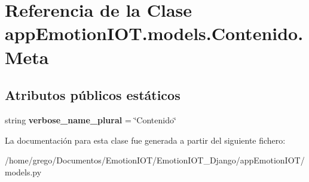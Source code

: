 \hypertarget{classappEmotionIOT_1_1models_1_1Contenido_1_1Meta}{}\section{Referencia de la Clase app\+Emotion\+I\+O\+T.\+models.\+Contenido.\+Meta}
\label{classappEmotionIOT_1_1models_1_1Contenido_1_1Meta}
\subsection*{Atributos públicos estáticos}
\begin{DoxyCompactItemize}
\item 
string {\bfseries verbose\+\_\+name\+\_\+plural} = \char`\"{}Contenido\char`\"{}\hypertarget{classappEmotionIOT_1_1models_1_1Contenido_1_1Meta_aca430b586f5138f87ab5629c97ee3789}{}\label{classappEmotionIOT_1_1models_1_1Contenido_1_1Meta_aca430b586f5138f87ab5629c97ee3789}

\end{DoxyCompactItemize}


La documentación para esta clase fue generada a partir del siguiente fichero\+:\begin{DoxyCompactItemize}
\item 
/home/grego/\+Documentos/\+Emotion\+I\+O\+T/\+Emotion\+I\+O\+T\+\_\+\+Django/app\+Emotion\+I\+O\+T/models.\+py\end{DoxyCompactItemize}
